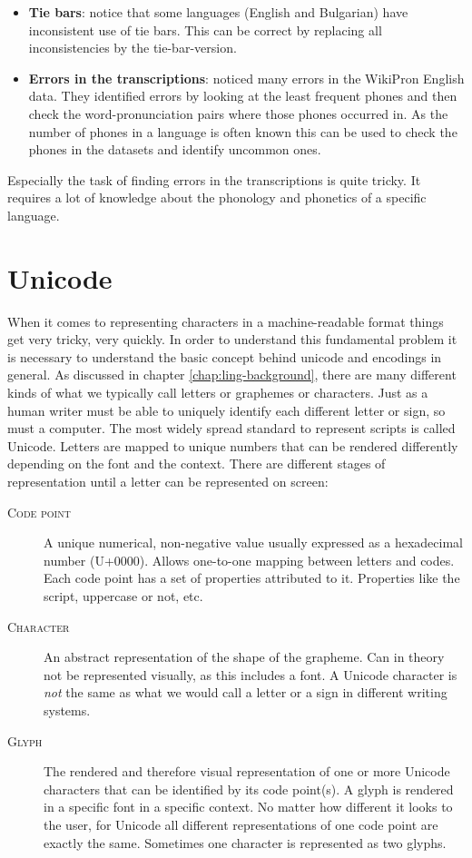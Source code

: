 \begin{itemize}
\item \textbf{Tie bars}: \cite{Ashby&Bartley.2021} notice that some languages (English and Bulgarian) have inconsistent use of tie bars. This can be correct by replacing all inconsistencies by the tie-bar-version.
\item \textbf{Errors in the transcriptions}: \citet{gautam.2021} noticed many errors in the WikiPron English data. They identified errors by looking at the least frequent phones and then check the word-pronunciation pairs where those phones occurred in. As the number of phones in a language is often known this can be used to check the phones in the datasets and identify uncommon ones. 
\end{itemize}

Especially the task of finding errors in the transcriptions is quite tricky. It requires a lot of knowledge about the phonology and phonetics of a specific language. 

\section{Unicode}
When it comes to representing characters in a machine-readable format things get very tricky, very quickly. In order to understand this fundamental problem it is necessary to understand the basic concept behind unicode and encodings in general. As discussed in chapter \ref{chap:ling-background}, there are many different kinds of what we typically call letters or graphemes or characters. Just as a human writer must be able to uniquely identify each different letter or sign, so must a computer. The most widely spread standard to represent scripts is called Unicode. Letters are mapped to unique numbers that can be rendered differently depending on the font and the context. There are different stages of representation until a letter can be represented on screen:

\begin{description}
\item[\textsc{Code point}] A unique numerical, non-negative value usually expressed as a hexadecimal number (U+0000). Allows one-to-one mapping between letters and codes. Each code point has a set of properties attributed to it. Properties like the script, uppercase or not, etc.
\item[\textsc{Character}] An abstract representation of the shape of the grapheme. Can in theory not be represented visually, as this includes a font. A Unicode character is \textit{not} the same as what we would call a letter or a sign in different writing systems.
\item[\textsc{Glyph}] The rendered and therefore visual representation of one or more Unicode characters that can be identified by its code point(s). A glyph is rendered in a specific font in a specific context. No matter how different it looks to the user, for Unicode all different representations of one code point are exactly the same. Sometimes one character is represented as two glyphs.
\end{description}

